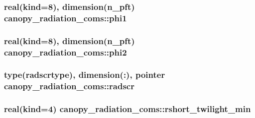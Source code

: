 \subsubsection[{\texorpdfstring{phi1}{phi1}}]{\setlength{\rightskip}{0pt plus 5cm}real(kind=8), dimension(n\+\_\+pft) canopy\+\_\+radiation\+\_\+coms\+::phi1}\hypertarget{namespacecanopy__radiation__coms_a03002619fd623b8e11ded7e257d4579f}{}\label{namespacecanopy__radiation__coms_a03002619fd623b8e11ded7e257d4579f}
\subsubsection[{\texorpdfstring{phi2}{phi2}}]{\setlength{\rightskip}{0pt plus 5cm}real(kind=8), dimension(n\+\_\+pft) canopy\+\_\+radiation\+\_\+coms\+::phi2}\hypertarget{namespacecanopy__radiation__coms_a84f81efa08280199991186a9f501c053}{}\label{namespacecanopy__radiation__coms_a84f81efa08280199991186a9f501c053}
\subsubsection[{\texorpdfstring{radscr}{radscr}}]{\setlength{\rightskip}{0pt plus 5cm}type({\bf radscrtype}), dimension(\+:), pointer canopy\+\_\+radiation\+\_\+coms\+::radscr}\hypertarget{namespacecanopy__radiation__coms_a77faeb46000116eff7d27da31a4ddfde}{}\label{namespacecanopy__radiation__coms_a77faeb46000116eff7d27da31a4ddfde}
\subsubsection[{\texorpdfstring{rshort\+\_\+twilight\+\_\+min}{rshort_twilight_min}}]{\setlength{\rightskip}{0pt plus 5cm}real(kind=4) canopy\+\_\+radiation\+\_\+coms\+::rshort\+\_\+twilight\+\_\+min}\hypertarget{namespacecanopy__radiation__coms_a3a226b3cec6a97cda6b397806da31988}{}\label{namespacecanopy__radiation__coms_a3a226b3cec6a97cda6b397806da31988}
